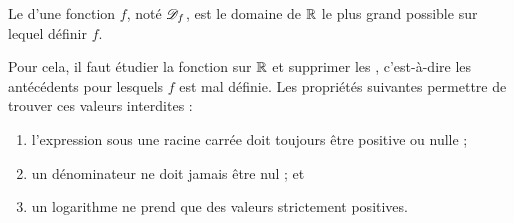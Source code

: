 

\SetDate[16/09/2026]





\ExerciseSelect
	[label={
		exe:prop-fond-enonce,%
		exe:Cf,%
		exe:prop-fond,%
		exe:Cf-affine,%
		exe:images-selon-forme,%
		exe:graph-droite2,%
		exe:f-equals-g,%
		exe:y-shift,%
		exe:eq-ineq,%
		exe:deg3,%
		exe:proj-xp1,%
		exe:infinite-antecedents,%
		exe:draw-plusc,%
		exe:affine-intersection,%
		exe:fonctions14,%
	}]

\ExerciseStopSelect


\begin{definition*}%
	Le  d'une fonction $f$, noté $\mathcal{D}_f$, est le domaine de $\mathbb{R}$ le plus grand possible sur lequel définir $f$.
	
	Pour cela, il faut étudier la fonction sur $\mathbb{R}$ et supprimer les , c'est-à-dire les antécédents pour lesquels $f$ est mal définie.
	Les propriétés suivantes permettre de trouver ces valeurs interdites :
		\begin{enumerate}
			\item l'expression sous une racine carrée doit toujours être positive ou nulle ;
			\item un dénominateur ne doit jamais être nul ; et
			\item un logarithme ne prend que des valeurs strictement positives.
		\end{enumerate}
\end{definition*}

\ExerciseSelect
	[label={
		exe:mediatrice,%
		exe:domaine-def,%
		exe:domaine-def-graphique,%
		exe:sqr-p-1,%
		exe:domaine-def-log,%
	}]

\ExerciseStopSelect


\newpage
{}
\shipoutAnswer


